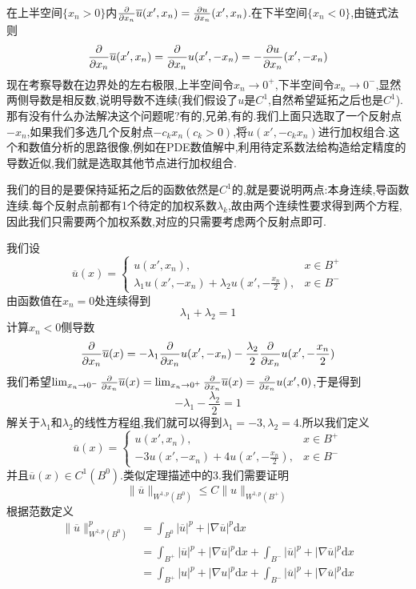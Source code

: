 在上半空间$\{x_n>0\}$内$\frac{\partial}{\partial x_n}\overline{u}(x',x_n)=\frac{\partial u}{\partial x_n}(x',x_n)$.在下半空间$\{x_n<0\}$,由链式法则
$$
\frac{\partial}{\partial x_n}\overline{u}(x',x_n)=\frac{\partial}{\partial x_n}u(x',-x_n)=-\frac{\partial u}{\partial x_n}(x',-x_n)
$$
现在考察导数在边界处的左右极限,上半空间令$x_n\to 0^+$,下半空间令$x_n\to 0^-$,显然两侧导数是相反数,说明导数不连续(我们假设了$u$是$C^1$,自然希望延拓之后也是$C^1$).那有没有什么办法解决这个问题呢?有的,兄弟,有的.我们上面只选取了一个反射点$-x_n$,如果我们多选几个反射点$-c_k x_n(c_k>0)$,将$u(x',-c_k x_n)$进行加权组合.这个和数值分析的思路很像,例如在PDE数值解中,利用待定系数法给构造给定精度的导数近似,我们就是选取其他节点进行加权组合.\par
我们的目的是要保持延拓之后的函数依然是$C^1$的,就是要说明两点:本身连续,导函数连续.每个反射点前都有1个待定的加权系数$\lambda_k$,故由两个连续性要求得到两个方程,因此我们只需要两个加权系数,对应的只需要考虑两个反射点即可.\par
我们设
$$
\overline{u}(x)=
\begin{cases}
    u(x',x_n),&x\in B^+\\
    \lambda_1u(x',-x_n)+\lambda_2u(x',-\frac{x_n}{2}),&x\in B^-
\end{cases}
$$
由函数值在$x_n=0$处连续得到
$$
\lambda_1+\lambda_2=1
$$
计算$x_n<0$侧导数
$$
\frac{\partial}{\partial x_n}\overline{u}(x)=-\lambda_1\frac{\partial}{\partial x_n}u(x',-x_n)-\frac{\lambda_2}{2}\frac{\partial}{\partial x_n}u(x',-\frac{x_n}{2})
$$
我们希望$\lim_{x_n\to 0^-}\frac{\partial}{\partial x_n}\overline{u}(x)=\lim_{x_n\to 0^+}\frac{\partial}{\partial x_n}\overline{u}(x)=\frac{\partial}{\partial x_n}u(x',0)$,于是得到
$$
-\lambda_1-\frac{\lambda_2}{2}=1
$$
解关于$\lambda_1$和$\lambda_2$的线性方程组,我们就可以得到$\lambda_1=-3,\lambda_2=4$.所以我们定义
$$
\overline{u}(x)=
\begin{cases}
    u(x',x_n),&x\in B^+\\
    -3u(x',-x_n)+4u(x',-\frac{x_n}{2}),&x\in B^-
\end{cases}
$$
并且$\overline{u}(x)\in C^1(B^0)$.类似定理描述中的3.我们需要证明
$$
\|\overline{u}\|_{W^{1,p}(B^0)}\leqslant C\|u\|_{W^{1,p}(B^+)}
$$
根据范数定义
$$
\begin{aligned}
    \|\overline{u}\|_{W^{1,p}(B^0)}^p &= \int_{B^0}|\overline{u}|^p+|\nabla \overline{u}|^p\mathrm{d}x\\
                                      &= \int_{B^+}|\overline{u}|^p+|\nabla \overline{u}|^p\mathrm{d}x+\int_{B^-}|\overline{u}|^p+|\nabla \overline{u}|^p\mathrm{d}x\\
                                      &= \int_{B^+}|u|^p+|\nabla u|^p\mathrm{d}x+\int_{B^-}|\overline{u}|^p+|\nabla \overline{u}|^p\mathrm{d}x
\end{aligned}
$$
